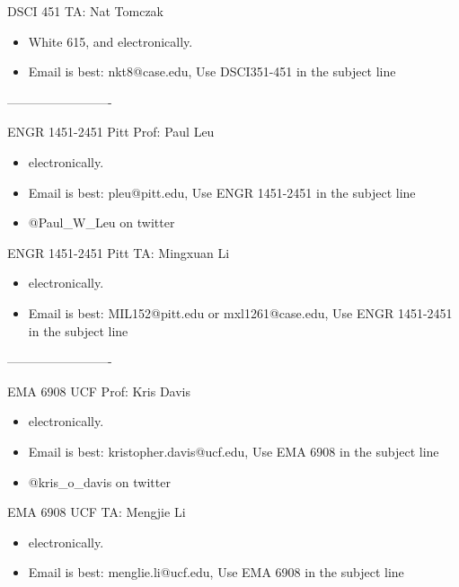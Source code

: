 \documentclass[10pt]{article} %
\begin{document}
  DSCI 451 TA: Nat Tomczak
  \begin{itemize}
  	\item White 615, and electronically.
  	\item Email is best: nkt8@case.edu, Use DSCI351-451 in the subject line
  \end{itemize}

-------------------------

  ENGR 1451-2451 Pitt Prof: Paul Leu
\begin{itemize}
  \item electronically.
  \item Email is best: pleu@pitt.edu, Use ENGR 1451-2451 in the subject line
  \item @Paul\_W\_Leu on twitter
\end{itemize}

  ENGR 1451-2451 Pitt TA: Mingxuan Li
\begin{itemize}
  \item electronically.
  \item Email is best: MIL152@pitt.edu or mxl1261@case.edu, Use ENGR 1451-2451 in the subject line
\end{itemize}

-------------------------

  EMA 6908 UCF Prof: Kris Davis
    \begin{itemize}
      \item electronically.
      \item Email is best: kristopher.davis@ucf.edu, Use EMA 6908 in the subject line
      \item @kris\_o\_davis on twitter
    \end{itemize}

  EMA 6908 UCF TA: Mengjie Li
    \begin{itemize}
      \item electronically.
      \item Email is best: menglie.li@ucf.edu, Use EMA 6908 in the subject line
    \end{itemize}
\end{document}
